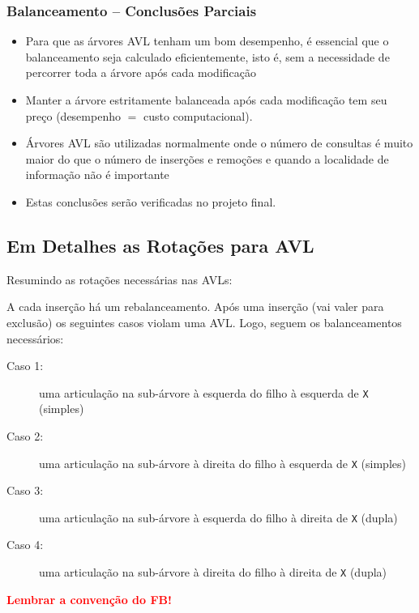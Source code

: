 \begin{frame}[fragile]
\frametitle{Balanceamento -- Conclusões Parciais}

\begin{itemize}
\item Para que as árvores AVL tenham um bom desempenho, é essencial que o balanceamento seja
calculado eficientemente, isto é, sem a necessidade de percorrer toda a árvore após cada
modificação

\item Manter a árvore estritamente balanceada após cada modificação tem seu preço (desempenho $=$ custo computacional).

\item Árvores AVL são utilizadas normalmente onde o número de consultas é muito maior do que o número de inserções e remoções e quando a localidade de informação não é importante

\item Estas conclusões serão verificadas no projeto final.

\end{itemize}
\end{frame}

\subsection{Em Detalhes as Rotações para AVL}

\begin{frame}

\begin{block}{Resumindo as rotações necessárias nas AVLs:}

A cada inserção há um rebalanceamento. Após uma inserção (vai valer para exclusão) os seguintes
casos violam uma AVL. Logo, seguem os balanceamentos necessários:
\begin{description}
 \item[Caso 1:] uma articulação na sub-árvore à esquerda do filho à esquerda de  \texttt{X} (simples)
 \item[Caso 2:] uma articulação na sub-árvore à direita do filho à esquerda de  \texttt{X} (simples)
 \item[Caso 3:] uma articulação na sub-árvore à esquerda do filho à direita de  \texttt{X} (dupla)    
 \item[Caso 4:] uma articulação na sub-árvore à direita do filho à direita de  \texttt{X} (dupla)        
\end{description}

\textbf{\textcolor{red}{Lembrar a convenção do FB!}}

\end{block}

\end{frame}

